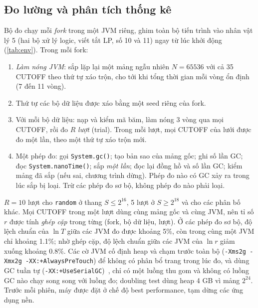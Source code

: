 \documentclass[12pt,a4paper]{article}
\begin{document}
\subsection{Đo lường và phân tích thống kê}\label{sec:4.3}\label{sec:4.4}\label{sec:4.5}
Bộ đo chạy mỗi \emph{fork} trong một JVM riêng, ghim toàn bộ tiến trình vào nhân vật lý 5 (hai bộ xử lý logic, viết tắt LP, số 10 và 11) ngay từ lúc khởi động (\cref{tab:env}). Trong mỗi fork:
\begin{enumerate}
\item \emph{Làm nóng JVM}: sắp lặp lại một mảng ngẫu nhiên $N = \num{65536}$ với cả 35 CUTOFF theo thứ tự xáo trộn, cho tới khi tổng thời gian mỗi vòng ổn định (7 đến 11 vòng).
\item Thứ tự các bộ dữ liệu được xáo bằng một seed riêng của fork.
\item Với mỗi bộ dữ liệu: nạp và kiểm mã băm, làm nóng 3 vòng qua mọi CUTOFF, rồi đo $R$ \emph{lượt} (trial). Trong mỗi lượt, mọi CUTOFF của lưới được đo một lần, theo một thứ tự xáo trộn mới.
\item Một phép đo: gọi \texttt{System.gc()}; tạo bản sao của mảng gốc; ghi số lần GC; đọc \texttt{System.nanoTime()}; sắp \emph{một lần}; đọc lại đồng hồ và số lần GC; kiểm mảng đã sắp (nếu sai, chương trình dừng). Phép đo nào có GC xảy ra trong lúc sắp bị loại. Trừ các phép đo sơ bộ, không phép đo nào phải loại.
\end{enumerate}
$R = 10$ lượt cho \texttt{random} ở thang $S \le 2^{16}$, 5 lượt ở $S \ge 2^{18}$ và cho các phân bố khác. Mọi CUTOFF trong một lượt dùng cùng mảng gốc và cùng JVM, nên tỉ số $r$ được tính \emph{ghép cặp} trong từng (fork, bộ dữ liệu, lượt). Ở các phép đo sơ bộ, độ lệch chuẩn của $\ln T$ giữa các JVM đo được khoảng 5\%, còn trong cùng một JVM chỉ khoảng 1.1\%; nhờ ghép cặp, độ lệch chuẩn giữa các JVM của $\ln r$ giảm xuống khoảng 0.8\%. Các cờ JVM cố định heap và chạm trước toàn bộ (\texttt{-Xms2g -Xmx2g -XX:+AlwaysPreTouch}) để không có phân bổ trang trong lúc đo, và dùng GC tuần tự (\texttt{-XX:+UseSerialGC})~\citep{jdk25}, chỉ có một luồng thu gom và không có luồng GC nào chạy song song với luồng đo; doubling test dùng heap 4 GB vì mảng $2^{24}$. Trước mỗi phiên, máy được đặt ở chế độ best performance, tạm dừng các ứng dụng nền.
\end{document}

